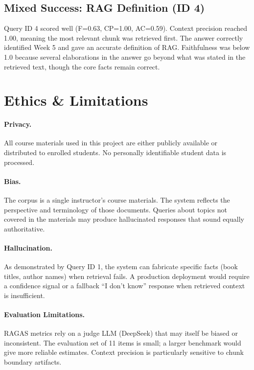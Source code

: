 \documentclass[11pt,a4paper]{article}
\begin{document}
\subsection{Mixed Success: RAG Definition (ID 4)}

Query ID 4 scored well (F=0.63, CP=1.00, AC=0.59).  Context precision reached
1.00, meaning the most relevant chunk was retrieved first.  The answer correctly
identified Week 5 and gave an accurate definition of RAG.  Faithfulness was below
1.0 because several elaborations in the answer go beyond what was stated in the
retrieved text, though the core facts remain correct.

\section{Ethics \& Limitations}

\paragraph{Privacy.}
All course materials used in this project are either publicly available or
distributed to enrolled students.  No personally identifiable student data is
processed.

\paragraph{Bias.}
The corpus is a single instructor's course materials.  The system reflects the
perspective and terminology of those documents.  Queries about topics not
covered in the materials may produce hallucinated responses that sound equally
authoritative.

\paragraph{Hallucination.}
As demonstrated by Query ID 1, the system can fabricate specific facts (book
titles, author names) when retrieval fails.  A production deployment would
require a confidence signal or a fallback ``I don't know'' response when
retrieved context is insufficient.

\paragraph{Evaluation Limitations.}
RAGAS metrics rely on a judge LLM (DeepSeek) that may itself be biased or
inconsistent.  The evaluation set of 11 items is small; a larger benchmark would
give more reliable estimates.  Context precision is particularly sensitive to
chunk boundary artifacts.
\end{document}
